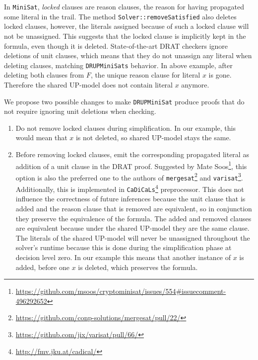 \documentclass[
]{report}
\begin{document}
In \texttt{MiniSat}, \emph{locked} clauses are reason clauses, the
reason for having propagated some literal in the trail. The method
\texttt{Solver::removeSatisfied} also deletes locked clauses, however,
the literals assigned because of such a locked clause will not be
unassigned. This suggests that the locked clause is implicitly kept in
the formula, even though it is deleted. State-of-the-art DRAT checkers
ignore deletions of unit clauses, which means that they do not unassign
any literal when deleting clauses, matching
\texttt{DRUPMiniSat\textquotesingle{}s} behavior. In above example,
after deleting both clauses from \(F\), the unique reason clause for
literal \(x\) is gone. Therefore the shared UP-model does not contain
literal \(x\) anymore.

We propose two possible changes to make \texttt{DRUPMiniSat} produce
proofs that do not require ignoring unit deletions when checking.

\begin{enumerate}
\def\labelenumi{\arabic{enumi}.}
\item
  Do not remove locked clauses during simplification. In our example,
  this would mean that \(x\) is not deleted, so shared UP-model stays
  the same.
\item
  Before removing locked clauses, emit the corresponding propagated
  literal as addition of a unit clause in the DRAT proof. Suggested by
  Mate Soos\footnote{\url{https://github.com/msoos/cryptominisat/issues/554\#issuecomment-496292652}},
  this option is also the preferred one to the authors of
  \texttt{mergesat}\footnote{\url{https://github.com/conp-solutions/mergesat/pull/22/}}
  and \texttt{varisat}\footnote{\url{https://github.com/jix/varisat/pull/66/}}.
  Additionally, this is implemented in
  \texttt{CaDiCaL\textquotesingle{}s}\footnote{\url{http://fmv.jku.at/cadical/}}
  preprocessor. This does not influence the correctness of future
  inferences because the unit clause that is added and the reason clause
  that is removed are equivalent, so in conjunction they preserve the
  equivalence of the formula. The added and removed clauses are
  equivalent because under the shared UP-model they are the same clause.
  The literals of the shared UP-model will never be unassigned
  throughout the solver's runtime because this is done during the
  simplification phase at decision level zero. In our example this means
  that another instance of \(x\) is added, before one \(x\) is deleted,
  which preserves the formula.
\end{enumerate}
\end{document}
